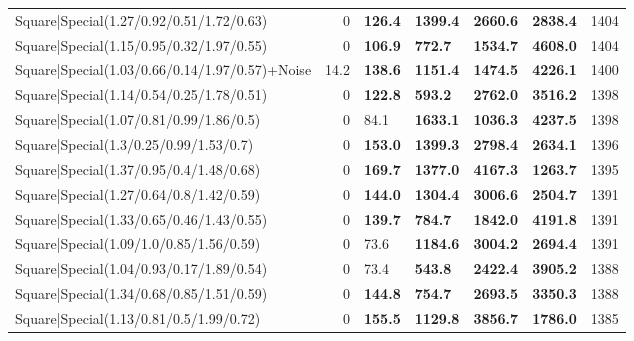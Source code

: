 \begin{tabular}{lrllllr}
 Square|Special(1.27/0.92/0.51/1.72/0.63)                      &             0   & \textbf{126.4} & \textbf{1399.4} & \textbf{2660.6} & \textbf{2838.4} &         1404 \\
 Square|Special(1.15/0.95/0.32/1.97/0.55)                      &             0   & \textbf{106.9} & \textbf{772.7}  & \textbf{1534.7} & \textbf{4608.0} &         1404 \\
 Square|Special(1.03/0.66/0.14/1.97/0.57)+Noise                &            14.2 & \textbf{138.6} & \textbf{1151.4} & \textbf{1474.5} & \textbf{4226.1} &         1400 \\
 Square|Special(1.14/0.54/0.25/1.78/0.51)                      &             0   & \textbf{122.8} & \textbf{593.2}  & \textbf{2762.0} & \textbf{3516.2} &         1398 \\
 Square|Special(1.07/0.81/0.99/1.86/0.5)                       &             0   & 84.1           & \textbf{1633.1} & \textbf{1036.3} & \textbf{4237.5} &         1398 \\
 Square|Special(1.3/0.25/0.99/1.53/0.7)                        &             0   & \textbf{153.0} & \textbf{1399.3} & \textbf{2798.4} & \textbf{2634.1} &         1396 \\
 Square|Special(1.37/0.95/0.4/1.48/0.68)                       &             0   & \textbf{169.7} & \textbf{1377.0} & \textbf{4167.3} & \textbf{1263.7} &         1395 \\
 Square|Special(1.27/0.64/0.8/1.42/0.59)                       &             0   & \textbf{144.0} & \textbf{1304.4} & \textbf{3006.6} & \textbf{2504.7} &         1391 \\
 Square|Special(1.33/0.65/0.46/1.43/0.55)                      &             0   & \textbf{139.7} & \textbf{784.7}  & \textbf{1842.0} & \textbf{4191.8} &         1391 \\
 Square|Special(1.09/1.0/0.85/1.56/0.59)                       &             0   & 73.6           & \textbf{1184.6} & \textbf{3004.2} & \textbf{2694.4} &         1391 \\
 Square|Special(1.04/0.93/0.17/1.89/0.54)                      &             0   & 73.4           & \textbf{543.8}  & \textbf{2422.4} & \textbf{3905.2} &         1388 \\
 Square|Special(1.34/0.68/0.85/1.51/0.59)                      &             0   & \textbf{144.8} & \textbf{754.7}  & \textbf{2693.5} & \textbf{3350.3} &         1388 \\
 Square|Special(1.13/0.81/0.5/1.99/0.72)                       &             0   & \textbf{155.5} & \textbf{1129.8} & \textbf{3856.7} & \textbf{1786.0} &         1385 \\

\end{tabular}
